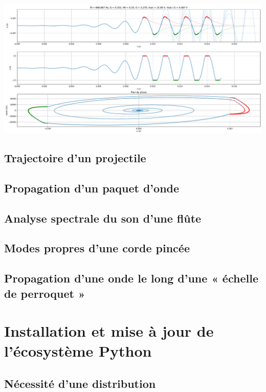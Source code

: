 \documentclass[10pt,aspectratio=169]{beamer}
\begin{document}
\begin{frame}
  \includegraphics[width = \linewidth]{plot-oscillateur-QS-python}
\end{frame}

\subsection{Trajectoire d'un projectile}

\subsection{Propagation d'un paquet d'onde}

\subsection{Analyse spectrale du son d'une flûte}

\subsection{Modes propres d'une corde pincée}

\subsection{Propagation d'une onde le long d'une « échelle de perroquet »}


\section{Installation et mise à jour de l'écosystème Python}

\subsection{Nécessité d'une distribution}
\end{document}
